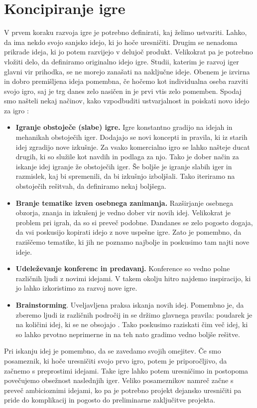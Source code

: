 \documentclass[12pt,a4paper,twoside]{book}
\begin{document}
\section{Koncipiranje igre}
V prvem koraku razvoja igre je potrebno definirati, kaj želimo ustvariti. Lahko, da ima nekdo svojo sanjsko idejo, ki jo hoče uresničiti. Drugim se nenadoma prikrade ideja, ki jo potem razvijejo v delujoč produkt. Velikokrat pa je potrebno vložiti delo, da definiramo originalno idejo igre. Studii, katerim je razvoj iger glavni vir prihodka, se ne morejo zanašati na naključne ideje. Obenem je izvirna in dobro premišljena ideja pomembna, če hočemo kot individualna oseba razviti svojo igro, saj je trg danes zelo nasičen in je prvi vtis zelo pomemben. Spodaj smo našteli nekaj načinov, kako vzpodbuditi ustvarjalnost in poiskati novo idejo za igro \cite{rogers2014level}: 
\begin{itemize}
	\item \textbf{Igranje obstoječe (slabe) igre.} Igre konstantno gradijo na idejah in mehanikah obstoječih iger. Dodajajo se novi koncepti in pravila, ki iz starih idej zgradijo nove izkušnje. Za vsako komercialno igro se lahko našteje ducat drugih, ki so služile kot navdih in podlaga za njo. Tako je dober način za iskanje idej igranje že obstoječih iger. Še boljše je igranje slabih iger in razmislek, kaj bi spremenili, da bi izkušnjo izboljšali. Tako iteriramo na obstoječih rešitvah, da definiramo nekaj boljšega.
	\item \textbf{Branje tematike izven osebnega zanimanja.} Razširjanje osebnega obzorja, znanja in izkušenj je vedno dober vir novih idej. Velikokrat je problem pri igrah, da so si preveč podobne. Dandanes se zelo pogosto dogaja, da vsi poskusijo kopirati idejo z nove uspešne igre. Zato je pomembno, da raziščemo tematike, ki jih ne poznamo najbolje in poskusimo tam najti nove ideje.
	\item \textbf{Udeleževanje konferenc in predavanj.} Konference so vedno polne različnih ljudi z novimi idejami. V takem okolju hitro najdemo inspiracijo, ki jo lahko izkoristimo za razvoj nove igre.
	\item \textbf{Brainstorming}. Uveljavljena praksa iskanja novih idej. Pomembno je, da zberemo ljudi iz različnih področij in se držimo glavnega pravila: poudarek je na količini idej, ki se ne obsojajo \cite{osborn1953applied}. Tako poskusimo raziskati čim več idej, ki so lahko prvotno neprimerne in na teh nato gradimo vedno boljše rešitve.
\end{itemize}
Pri iskanju idej je pomembno, da se zavedamo svojih omejitev. Če smo posameznik, ki hoče uresničiti svojo prvo igro, potem je priporočljivo, da začnemo s preprostimi idejami. Take igre lahko potem uresničimo in postopoma povečujemo obsežnost naslednjih iger. Veliko posameznikov namreč začne s preveč ambicioznimi idejami, ko pa je potrebno projekt dejansko uresničiti pa pride do komplikacij in pogosto do preliminarne zaključitve projekta.
\end{document}
